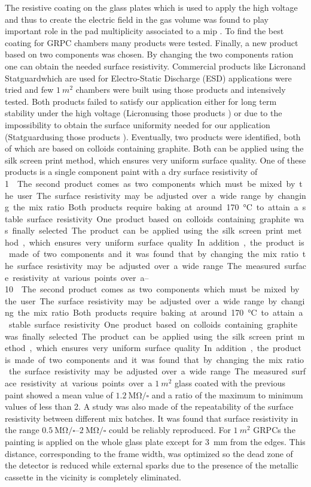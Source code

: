 The resistive coating on the glass plates which is used to apply the high
voltage and thus to create the electric field in the gas volume was found to
play important role in the pad multiplicity associated to a mip \cite{1748-0221-6-02-P02001}.
To find the best coating for GRPC chambers many products were tested. Finally, a
new product based on two components was chosen. By changing the two components
ration one can obtain the needed surface resistivity. Commercial products like
Licron\texttrademark and Statguard\texttrademark which are used for Electro-Static
Discharge (ESD) applications were tried and few $\SI{1}{m^2}$ chambers were built
using those products and intensively tested. Both products failed to satisfy our
application either for long term stability under the high voltage (Licronusing
those products ) or due to the impossibility to obtain the surface uniformity
needed for our application (Statguardusing those products ). Eventually, two
products were identified, both of which are based on colloids containing
graphite. Both can be applied using the silk screen print method, which ensures
very uniform surface quality. One of these products is a single component paint
with a dry surface resistivity of \SIrange{1}{10}{\mega\ohm\per\square}. The second product
comes as two components which must be mixed by the user. The surface resistivity
may be adjusted over a wide range by changing the mix ratio. Both products
require baking at around \SI{170}{\degreeCelsius} to attain a stable surface resistivity.
One product based on colloids containing graphite was finally selected. The
product can be applied using the silk screen print method, which ensures very
uniform surface quality. In addition, the product is made of two components and
it was found that by changing the mix ratio the surface resistivity may be
adjusted over a wide range.

The measured surface resistivity at various points over a $\SI{1}{m^2}$ glass coated
with the previous paint showed a mean value of $\SI{1.2}{\mega\ohm\per\square}$ and a
ratio of the maximum to minimum values of less than 2. A study was also made of
the repeatability of the surface resistivity between different mix batches. It
was found that surface resistivity in the range $\SIrange{0.5}{2}{\mega\ohm\per\square}$ could be
reliably reproduced. For $\SI{1}{m^2}$ GRPCs the painting is applied on the whole
glass plate except for \SI{3}{mm} from the edges. This distance, corresponding to the
frame width, was optimized so the dead zone of the detector is reduced while
external sparks due to the presence of the metallic cassette in the vicinity is
completely eliminated.


